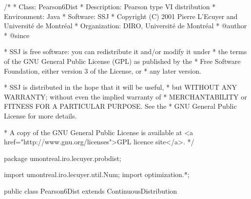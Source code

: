\begin{code}
\begin{hide}
/*
 * Class:        Pearson6Dist
 * Description:  Pearson type VI distribution
 * Environment:  Java
 * Software:     SSJ 
 * Copyright (C) 2001  Pierre L'Ecuyer and Université de Montréal
 * Organization: DIRO, Université de Montréal
 * @author       
 * @since

 * SSJ is free software: you can redistribute it and/or modify it under
 * the terms of the GNU General Public License (GPL) as published by the
 * Free Software Foundation, either version 3 of the License, or
 * any later version.

 * SSJ is distributed in the hope that it will be useful,
 * but WITHOUT ANY WARRANTY; without even the implied warranty of
 * MERCHANTABILITY or FITNESS FOR A PARTICULAR PURPOSE.  See the
 * GNU General Public License for more details.

 * A copy of the GNU General Public License is available at
   <a href="http://www.gnu.org/licenses">GPL licence site</a>.
 */
\end{hide}
package umontreal.iro.lecuyer.probdist;
\begin{hide}
import umontreal.iro.lecuyer.util.Num;
import optimization.*;
\end{hide}

public class Pearson6Dist extends ContinuousDistribution\begin{hide} {
   protected double alpha1;
   protected double alpha2;
   protected double beta;
   protected double logBeta; // Ln (Beta (alpha1, alpha2))

   private static class Optim implements Uncmin_methods {
      private int n;
      private double[] x;

      public Optim (double[] x, int n) {
         this.n = n;
         this.x = new double[n];
         System.arraycopy (x, 0, this.x, 0, n);
      }

      public double f_to_minimize (double[] param) {

         if ((param[1] <= 0.0) || (param[2] <= 0.0) || (param[3] <= 0.0))
            return 1e200;

         double sumLogY = 0.0;
         double sumLog1_Y = 0.0;
         for (int i = 0; i < n; i++)
         {
            if (x[i] > 0.0)
               sumLogY += Math.log (x[i] / param[3]);
            else
               sumLogY -= 709.0;
            sumLog1_Y += Math.log1p (x[i] / param[3]);
         }

         return (n * (Math.log (param[3]) + Num.lnBeta (param[1], param[2])) -
         (param[1] - 1.0) * sumLogY + (param[1] + param[2]) * sumLog1_Y);
      }

      public void gradient (double[] x, double[] g)
      {
      }

      public void hessian (double[] x, double[][] h)
      {
      }
   }
\end{hide}\end{code}
